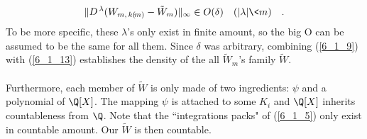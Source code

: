 \begin{align}\label{6_1_13}
 \| D^{\,\lambda} (W_{m,\, k(\!m)} - \tilde{W}_m ) \|_\infty  \in O(\delta)\quad (\lvert \lambda \rvert\< m) \quad   . 
\end{align}
To be more specific, these $\lambda$'s only exist in finite  amount, so the big O can be assumed to be the same for all them. Since $\delta$ was arbitrary, combining  (\ref{6_1_9}) with (\ref{6_1_13}) establishes the density of the all $\tilde{W}_m$'s family $\tilde{W}$.\\
\\
Furthermore, each member of $\tilde{W}$ is only made of two ingredients: $\psi$ and a polynomial of $\Q[X]$. The mapping $\psi$ is attached to some $K_i$ and $\Q[X]$ inherits countableness from $\Q$. Note that the ``integrations packs" of (\ref{6_1_5}) only exist in countable amount. Our $\tilde{W}$ is then countable.\QED












